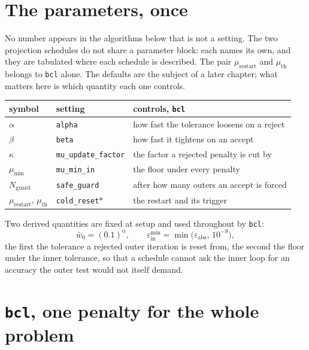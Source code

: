 \documentclass[a4paper,11pt]{book}
\theoremstyle{plain}
\theoremstyle{definition}
\theoremstyle{remark}
\numberwithin{equation}{chapter}
\numberwithin{algorithm}{chapter}
\begin{document}
	\section{The parameters, once}

	No number appears in the algorithms below that is not a setting. The two
	projection schedules do not share a parameter block: each names its own, and
	they are tabulated where each schedule is described. The pair
	$\mu_{\mathrm{restart}}$ and $\mu_{\mathrm{th}}$ belongs to \texttt{bcl}
	alone. The defaults
	are the subject of a later chapter; what matters here is which quantity each
	one controls.

	\begin{table}[H]
		\centering\small
		\begin{tabular}{lll}
			\toprule
			symbol & setting & controls, \texttt{bcl}\\
			\midrule
			$\alpha$ & \texttt{alpha} & how fast the tolerance loosens on a reject\\
			$\beta$ & \texttt{beta} & how fast it tightens on an accept\\
			$\kappa$ & \texttt{mu\_update\_factor} & the factor a rejected penalty
			is cut by\\
			$\mu_{\min}$ & \texttt{mu\_min\_in} & the floor under every penalty\\
			$N_{\mathrm{guard}}$ & \texttt{safe\_guard} & after how many outers an
			accept is forced\\
			$\mu_{\mathrm{restart}}$, $\mu_{\mathrm{th}}$
			& \texttt{cold\_reset}$\ast$ & the restart and its trigger\\
			\bottomrule
		\end{tabular}
	\end{table}

	Two derived quantities are fixed at setup and used throughout by \texttt{bcl}:
	\begin{equation}
		\bar w_0=(0.1)^{\alpha},
		\qquad
		\varepsilon^{\min}_{\mathrm{in}}
		=\min\bigl(\varepsilon_{\mathrm{abs}},\,10^{-9}\bigr) ,
	\end{equation}
	the first the tolerance a rejected outer iteration is reset from, the second
	the floor under the inner tolerance, so that a schedule cannot ask the inner
	loop for an accuracy the outer test would not itself demand.

	\section{\texttt{bcl}, one penalty for the whole problem}
\end{document}

